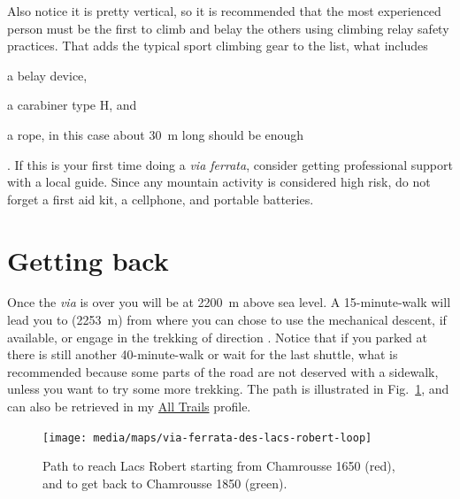 Also notice it is pretty vertical, so it is recommended that the most experienced person must be the first to climb and belay the others using climbing relay safety practices. That adds the typical sport climbing gear to the list, what includes \begin{inparaenum}[(i)] \item a belay device, \item a carabiner type H, and \item a rope, in this case about 30~m long should be enough\end{inparaenum}. If this is your first time doing a \emph{via ferrata}, consider getting professional support with a local guide. Since any mountain activity is considered high risk, do not forget a first aid kit, a cellphone, and portable batteries.

\section*{Getting back}

Once the \emph{via} is over you will be at 2200~m above sea level. A 15-minute-walk will lead you to  (2253~m) from where you can chose to use the mechanical descent, if available, or engage in the trekking of  direction . Notice that if you parked at  there is still another 40-minute-walk or wait for the last shuttle, what is recommended because some parts of the road are not deserved with a sidewalk, unless you want to try some more trekking.  The path is illustrated in Fig.~\ref{fig:map-via-ferrata-des-lacs-robert}, and can also be retrieved in my \href{https://www.alltrails.com/fr/explore/map/carte-29-decembre-2022-af0a59d}{All Trails} profile.

\begin{figure}[!h]
\centering%
\texttt{[image: media/maps/via-ferrata-des-lacs-robert-loop]}
\caption{\label{fig:map-via-ferrata-des-lacs-robert}Path to reach Lacs Robert starting from Chamrousse 1650  (red), and to get back to Chamrousse 1850  (green).}
\end{figure}

\endinput